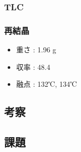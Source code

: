 \subsubsection*{TLC}


\subsubsection*{再結晶}
\begin{itemize}
\item 重さ : 1.96 g
\item 収率 : 48.4%
\item 融点 : 132℃, 134℃


\end{itemize}
\subsection*{考察}

\subsection*{課題}

